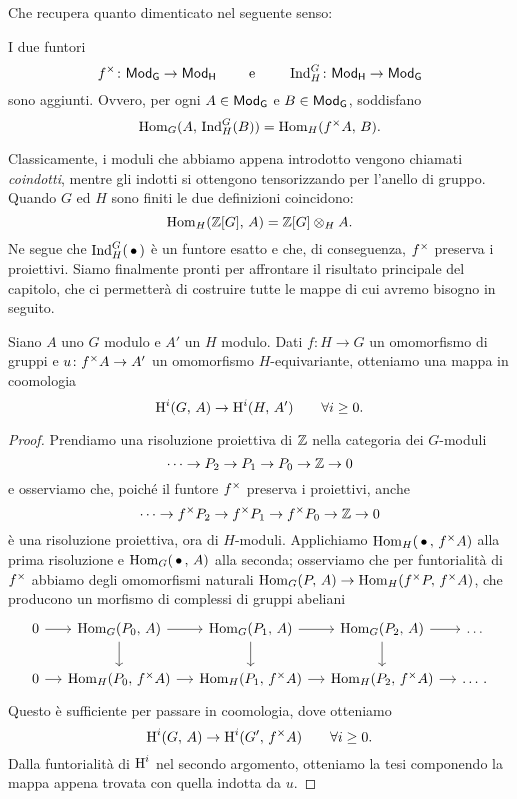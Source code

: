 Che recupera quanto dimenticato nel seguente senso:

\begin{proposition}\label{aggiunzione}
	I due funtori
	\[ f^\times \colon \mathsf{Mod}_\mathsf{G} \to \mathsf{Mod}_\mathsf{H} \qquad\text{ e }\qquad  \operatorname{Ind}_H^G \colon \mathsf{Mod}_\mathsf{H} \to \mathsf{Mod}_\mathsf{G} \]
	sono aggiunti. Ovvero, per ogni $ A \in \mathsf{Mod}_\mathsf{G} $ e $ B \in \mathsf{Mod}_\mathsf{G} $, soddisfano
	\[ \operatorname{Hom}_G(A,\, \operatorname{Ind}_H^G(B)) = \operatorname{Hom}_H(f^\times A, \, B). \]
\end{proposition}

Classicamente, i moduli che abbiamo appena introdotto vengono chiamati \emph{coindotti}, mentre gli indotti si ottengono tensorizzando per l'anello di gruppo. Quando $ G $ ed $ H $ sono finiti le due definizioni coincidono:
\[ \operatorname{Hom}_H(\mathbb{Z}[G], \, A)  = \mathbb{Z}[G] \otimes_H A. \]
Ne segue che $ \operatorname{Ind}_{H}^G(\, \bullet \, ) $ è un funtore esatto e che, di conseguenza, $ f^\times $ preserva i proiettivi. Siamo finalmente pronti per affrontare il risultato principale del capitolo, che ci permetterà di costruire tutte le mappe di cui avremo bisogno in seguito.
\begin{proposition}\label{funct}
	Siano  $ A $ uno $ G $ modulo e $ A' $ un $ H $ modulo. Dati $ f \colon H \to G $ un omomorfismo di gruppi e $ u \colon f^\times A \to A' $ un omomorfismo $ H $-equivariante, otteniamo una mappa in coomologia
	\[ \operatorname{H}^i(G, \, A) \to \operatorname{H}^i(H, \, A') \qquad\forall i \geq 0. \]
\end{proposition}

\begin{proof}
	Prendiamo una risoluzione proiettiva di $ \mathbb{Z} $ nella categoria dei $ G $-moduli
	\[ \dots \to P_2 \to P_1 \to P_0 \to \mathbb{Z} \to 0 \]
	e osserviamo che, poiché il funtore $ f^\times $ preserva i proiettivi, anche
	\[ \dots \to f^\times P_2 \to  f^\times P_1 \to f^\times P_0 \to \mathbb{Z} \to 0 \]
	è una risoluzione proiettiva, ora di $ H $-moduli.
	Applichiamo $ \operatorname{Hom}_H(\,\bullet\, ,\, f^\times A) $ alla prima risoluzione e $ \operatorname{Hom}_G(\,\bullet\, ,\, A) $ alla seconda; osserviamo che per funtorialità di $ f^\times $ abbiamo degli omomorfismi naturali $ \operatorname{Hom}_{G}(P, \, A) \to \operatorname{Hom}_{H}(f^\times P, \,f^\times A) $, che producono un morfismo di complessi di gruppi abeliani
	\[\begin{tikzcd}[column sep = small]
	0 \rar
	& \Hom_{G}(P_0, \, A) \rar \dar
	& \Hom_{G}(P_1, \, A) \rar \dar
	& \Hom_{G}(P_2, \, A) \rar \dar
	& \dots \\
	0 \rar
	& \Hom_{H}(P_0, \,\f A) \rar
	& \Hom_{H}(P_1, \,\f A) \rar
	& \Hom_{H}(P_2, \,\f A) \rar
	& \dots	\, .
	\end{tikzcd} \]
	Questo è sufficiente per passare in coomologia, dove otteniamo
	\[ \operatorname{H}^i(G, \, A) \to \operatorname{H}^i(G', \, f^\times A) \qquad \forall i \geq 0. \]
	Dalla funtorialità di $ \operatorname{H}^i $ nel secondo argomento, otteniamo la tesi componendo la mappa appena trovata con quella indotta da $ u $.
\end{proof}

